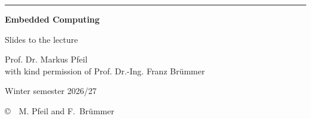 \documentclass[12pt,a5paper,landscape,openany]{book}
\begin{document}

\pagecolor{\pagecol}

\sffamily\Large
\thispagestyle{empty}
\vspace*{-2mm}
\rwulogo[height=1.6cm]

\vspace*{1.2cm}
{\color{rwuviolet}\rule{\textwidth}{0.7mm}}

\vspace*{5mm}
{\fontsize{30}{36}\selectfont\bfseries\color{rwuviolet} Embedded Computing}

\vspace*{3mm}
{\Large\color{rwucyandark} Slides to the lecture}

\vspace*{6mm}
{\large Prof. Dr. Markus Pfeil}\\[1mm]
{\normalsize\color{rwugray} with kind permission of Prof. Dr.-Ing. Franz Br\"{u}mmer}

\vspace*{4mm}
{\large Winter semester 2026/27}

\vfill
{\scriptsize\color{rwugray} \copyright~~M. Pfeil and F.\ Br\"{u}mmer}
\newpage


\begin{center}\parbox{0.6\textwidth}{\large \parskip -2mm
\tableofcontents}
\end{center}

\baselineskip 5mm
\nocite{*}
\def\refname{Literatur}


\renewcommand{\chapter}[1]{\refstepcounter{chapter}\newpage
       \textcolor{headcol}{\begin{center}\Huge\bfseries
      \thechapter~ #1\end{center}}\addcontentsline{toc}{chapter}{#1}
}


\end{document}
